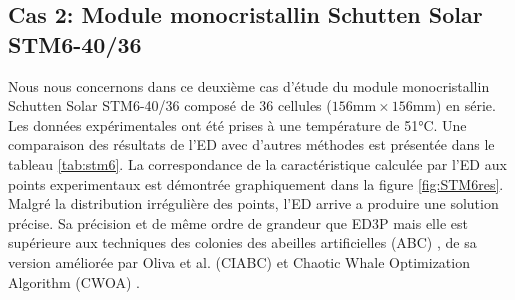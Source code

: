 
\subsection{Cas 2: Module monocristallin Schutten Solar STM6-40/36}

Nous nous concernons dans ce deuxième cas d'étude du module monocristallin Schutten Solar STM6-40/36 composé de 36 cellules ($156\si{\milli\meter}\times 156\si{\milli\meter}$) en série. Les données expérimentales ont été prises à une température de 51\si{\celsius}. Une comparaison des résultats de l'ED avec d'autres méthodes est présentée dans le tableau \ref{tab:stm6}. La correspondance de la caractéristique calculée par l'ED aux points experimentaux est démontrée graphiquement dans la figure \ref{fig:STM6res}. Malgré la distribution irrégulière des points, l'ED arrive a produire une solution précise. Sa précision et de même ordre de grandeur que ED3P \cite{Chin2019} mais elle est supérieure aux techniques des colonies des abeilles artificielles (ABC) \cite{Oliva2014}, de sa version améliorée par Oliva et al. (CIABC) \cite{Oliva2017a} et Chaotic Whale Optimization Algorithm (CWOA) \cite{Oliva2017}.

